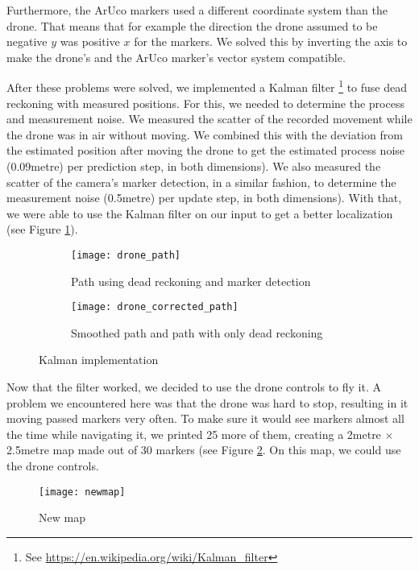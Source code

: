 \documentclass[12pt]{article}
\begin{document}
Furthermore, the ArUco markers used a different coordinate system than the drone. That means that for example the direction the drone assumed to be negative \(y\) was positive \(x\) for the markers. We solved this by inverting the axis to make the drone's and the ArUco marker's vector system compatible.

After these problems were solved, we implemented a Kalman filter
\footnote{
	See \url{https://en.wikipedia.org/wiki/Kalman_filter}
} to fuse dead reckoning with measured positions. For this, we needed to determine the process and measurement noise. We measured the scatter of the recorded movement while the drone was in air without moving. We combined this with the deviation from the estimated position after moving the drone to get the estimated process noise (\num{0.09}\si{metre}) per prediction step, in both dimensions). We also measured the scatter of the camera's marker detection, in a similar fashion, to determine the measurement noise (\num{0.5}\si{metre}) per update step, in both dimensions). With that, we were able to use the Kalman filter on our input to get a better localization (see Figure \ref{fig:kalman}).

\begin{figure}[htbp]
	\centering
	\begin{subfigure}[b]{0.45\textwidth}
		\texttt{[image: drone\_path]}
		\caption{Path using dead reckoning and marker detection}
	\end{subfigure}
	\quad
	\begin{subfigure}[b]{0.45\textwidth}
		\texttt{[image: drone\_corrected\_path]}
		\caption{Smoothed path and path with only dead reckoning}
	\end{subfigure}
	\caption{Kalman implementation}
	\label{fig:kalman}
\end{figure}

Now that the filter worked, we decided to use the drone controls to fly it. A problem we encountered here was that the drone was hard to stop, resulting in it moving passed markers very often. To make sure it would see markers almost all the time while navigating it, we printed \num{25} more of them, creating a \num{2}\si{metre} \(\times\) \num{2.5}\si{metre} map made out of \num{30} markers (see Figure \ref{fig:newmap}. On this map, we could use the drone controls.

\begin{figure}[htbp]
  \centering
  \texttt{[image: newmap]}
  \caption{New map}
  \label{fig:newmap}
\end{figure}
\end{document}
